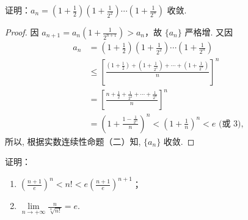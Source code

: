 \begin{example}\label{ex:1.4.10}
证明：$a_{n} = \left(1 + \frac{1}{2}\right)\left(1 + \frac{1}{2^{2}}\right)\cdots\left(1 + \frac{1}{2^{n}}\right)$ 收敛.
\end{example}

\begin{proof}
因 $a_{n+1} = a_{n}\left(1 + \frac{1}{2^{n+1}}\right) > a_{n}$，故 $\{a_{n}\}$ 严格增. 又因
\[
\begin{aligned}
a_{n} &= \left(1 + \frac{1}{2}\right)\left(1 + \frac{1}{2^{2}}\right)\cdots\left(1 + \frac{1}{2^{n}}\right) \\
&\leqslant \left[\frac{\left(1 + \frac{1}{2}\right) + \left(1 + \frac{1}{2^{2}}\right) + \cdots + \left(1 + \frac{1}{2^{n}}\right)}{n}\right]^{n} \\
&= \left[\frac{n + \frac{1}{2} + \frac{1}{2^{2}} + \cdots + \frac{1}{2^{n}}}{n}\right]^{n} \\
&= \left(1 + \frac{1 - \frac{1}{2^{n}}}{n}\right)^{n} < \left(1 + \frac{1}{n}\right)^{n} < e\text{ (或 3)},
\end{aligned}
\]
所以, 根据实数连续性命题（二）知, $\{a_{n}\}$ 收敛.
\end{proof}

\begin{example}\label{ex:1.4.11}
证明：
\begin{enumerate}
\item $\left(\frac{n+1}{e}\right)^{n} < n! < e\left(\frac{n+1}{e}\right)^{n+1}$；
\item $\lim\limits_{n \to +\infty} \frac{n}{\sqrt[n]{n!}} = e$.
\end{enumerate}
\end{example}

